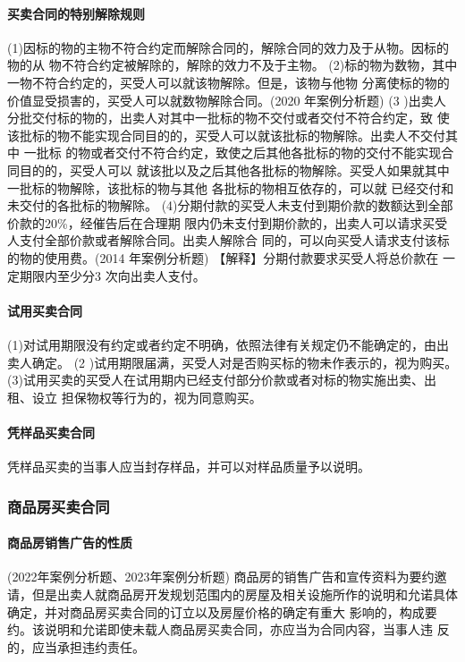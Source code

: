 \documentclass[UTF8,12pt]{ctexart}
\numberwithin{equation}{section} %
\numberwithin{figure}{section}
\numberwithin{table}{section}
\begin{document}
	
	\paragraph{买卖合同的特别解除规则} 
	(1)因标的物的主物不符合约定而解除合同的，解除合同的效力及于从物。因标的物的从 物不符合约定被解除的，解除的效力不及于主物。
	(2)标的物为数物，其中 一物不符合约定的，买受人可以就该物解除。但是，该物与他物 分离使标的物的价值显受损害的，买受人可以就数物解除合同。(2020 年案例分析题)
	(3 )出卖人分批交付标的物的，出卖人对其中一批标的物不交付或者交付不符合约定，致 使该批标的物不能实现合同目的的，买受人可以就该批标的物解除。出卖人不交付其中 一批标 的物或者交付不符合约定，致使之后其他各批标的物的交付不能实现合同目的的，买受人可以 就该批以及之后其他各批标的物解除。买受人如果就其中一批标的物解除，该批标的物与其他 各批标的物相互依存的，可以就 已经交付和未交付的各批标的物解除。 (4)分期付款的买受人未支付到期价款的数额达到全部价款的20\%，经催告后在合理期 限内仍未支付到期价款的，出卖人可以请求买受人支付全部价款或者解除合同。出卖人解除合 同的，可以向买受人请求支付该标的物的使用费。(2014 年案例分析题)
	【解释】分期付款要求买受人将总价款在 一定期限内至少分3 次向出卖人支付。
	
	\paragraph{试用买卖合同} (1)对试用期限没有约定或者约定不明确，依照法律有关规定仍不能确定的，由出卖人确定。 (2 )试用期限届满，买受人对是否购买标的物未作表示的，视为购买。 (3)试用买卖的买受人在试用期内已经支付部分价款或者对标的物实施出卖、出租、设立 担保物权等行为的，视为同意购买。
	
	\paragraph{凭样品买卖合同}
	凭样品买卖的当事人应当封存样品，并可以对样品质量予以说明。
	
	\subsubsection{商品房买卖合同}
	
	\paragraph{商品房销售广告的性质}(2022年案例分析题、2023年案例分析题) 商品房的销售广告和宣传资料为要约邀请，但是出卖人就商品房开发规划范围内的房屋及相关设施所作的说明和允诺具体确定，并对商品房买卖合同的订立以及房屋价格的确定有重大 影响的，构成要约。该说明和允诺即使未载人商品房买卖合同，亦应当为合同内容，当事人违 反的，应当承担违约责任。
	
\end{document}
